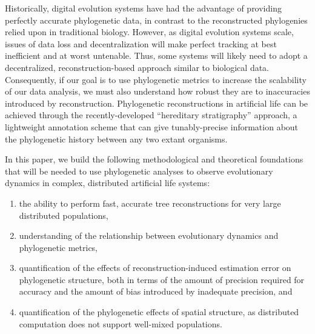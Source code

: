 Historically, digital evolution systems have had the advantage of providing perfectly accurate phylogenetic data, in contrast to the reconstructed phylogenies relied upon in traditional biology.
However, as digital evolution systems scale, issues of data loss and decentralization will make perfect tracking at best inefficient and at worst untenable.
Thus, some systems will likely need to adopt a decentralized, reconstruction-based approach similar to biological data.
Consequently, if our goal is to use phylogenetic metrics to increase the scalability of our data analysis, we must also understand how robust they are to inaccuracies introduced by reconstruction.
Phylogenetic reconstructions in artificial life can be achieved through the recently-developed ``hereditary stratigraphy'' approach, a lightweight annotation scheme that can give tunably-precise information about the phylogenetic history between any two extant organisms.

In this paper, we build the following methodological and theoretical foundations that will be needed to use phylogenetic analyses to observe evolutionary dynamics in complex, distributed artificial life systems:
\begin{enumerate}
  \item the ability to perform fast, accurate tree reconstructions for very large distributed populations,
  \item understanding of the relationship between evolutionary dynamics and phylogenetic metrics,
  \item quantification of the effects of reconstruction-induced estimation error on phylogenetic structure, both in terms of the amount of precision required for accuracy and the amount of bias introduced by inadequate precision, and
  \item quantification of the phylogenetic effects of spatial structure, as distributed computation does not support well-mixed populations.
\end{enumerate}

